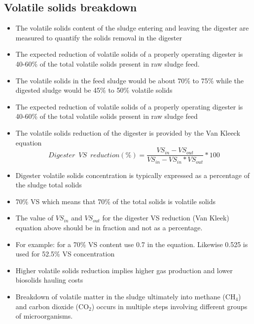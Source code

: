 \subsection{Volatile solids breakdown}
                        \begin{itemize}
                            \item The volatile solids content of the sludge entering and leaving the digester are measured to quantify the solids removal in the digester
                            \item The expected reduction of volatile solids of a properly operating digester is 40-60\% of the total volatile solids present in raw sludge feed.
                            \item The volatile solids in the feed sludge would be about 70\% to 75\% while the digested sludge would be 45\% to 50\% volatile solids
                            \item The expected reduction of volatile solids of a properly operating digester is 40-60\% of the total volatile solids present in raw sludge feed
                            \item The volatile solids reduction of the digester is provided by the Van Kleeck equation 
                            $$Digester \enspace VS \enspace reduction (\%)=\dfrac{VS_{in}-VS_{out}}{VS_{in}-VS_{in}*VS_{out}}*100$$
                            \item Digester volatile solids concentration is typically expressed as a percentage of the sludge total solids
                            \item 70\% VS which means that 70\% of the total solids is volatile solids
                            \item The value of $VS_{in}$ and $VS_{out}$ for the digester VS reduction (Van Kleek) equation above should be in fraction and not as a percentage.
                            \item For example:  for a 70\% VS content use 0.7 in the equation.  Likewise 0.525 is used for 52.5\% VS concentration\\
                            \item Higher volatile solids reduction implies higher gas production and lower biosolids hauling costs
                            \item Breakdown of volatile matter in the sludge ultimately into methane (CH$_4$) and carbon dioxide (CO$_2$) occurs in multiple steps involving different groups of microorganisms.\\

\end{itemize}
